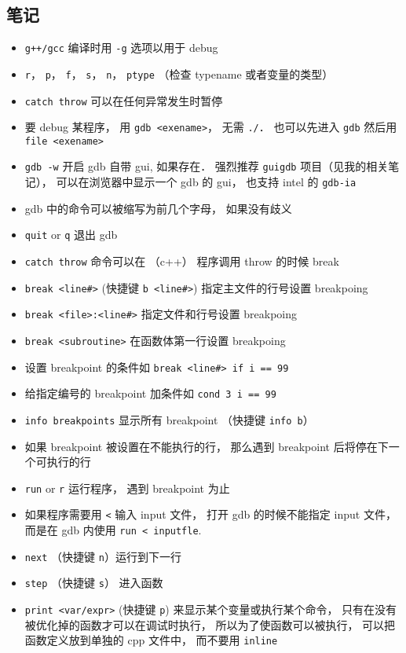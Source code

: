 

\subsection{笔记}
\begin{itemize}
\item \verb|g++/gcc| 编译时用 \verb`-g` 选项以用于 debug
\item \verb|r|， \verb|p|， \verb|f|， \verb|s|， \verb|n|， \verb|ptype| （检查 typename 或者变量的类型）
\item \verb|catch throw| 可以在任何异常发生时暂停
\item 要 debug 某程序， 用 \verb`gdb <exename>`， 无需 \verb`./`． 也可以先进入 \verb`gdb` 然后用 \verb`file <exename>`
\item \verb`gdb -w` 开启 gdb 自带 gui, 如果存在． 强烈推荐 \verb`guigdb` 项目（见我的相关笔记）， 可以在浏览器中显示一个 gdb 的 gui， 也支持 intel 的 \verb`gdb-ia`
\item gdb 中的命令可以被缩写为前几个字母， 如果没有歧义
\item \verb`quit` or \verb`q` 退出 gdb
\item \verb`catch throw` 命令可以在 （c++） 程序调用 throw 的时候 break
\item \verb`break <line#>`  (快捷键 \verb`b <line#>`) 指定主文件的行号设置 breakpoing
\item \verb`break <file>:<line#>` 指定文件和行号设置 breakpoing
\item \verb`break <subroutine>` 在函数体第一行设置 breakpoing
\item 设置 breakpoint 的条件如 \verb`break <line#> if i == 99`
\item 给指定编号的 breakpoint 加条件如 \verb`cond 3 i == 99`
\item \verb`info breakpoints` 显示所有 breakpoint （快捷键 \verb`info b`）
\item 如果 breakpoint 被设置在不能执行的行， 那么遇到 breakpoint 后将停在下一个可执行的行
\item \verb`run` or \verb`r` 运行程序， 遇到 breakpoint 为止
\item 如果程序需要用 \verb`<` 输入 input 文件， 打开 gdb 的时候不能指定 input 文件， 而是在 gdb 内使用 \verb`run < inputfle`.
\item \verb`next` （快捷键 \verb`n`）运行到下一行 
\item \verb`step` （快捷键 \verb`s`） 进入函数
\item \verb`print <var/expr>` (快捷键 \verb`p`) 来显示某个变量或执行某个命令， 只有在没有被优化掉的函数才可以在调试时执行， 所以为了使函数可以被执行， 可以把函数定义放到单独的 cpp 文件中， 而不要用 \verb`inline`

\end{itemize}

